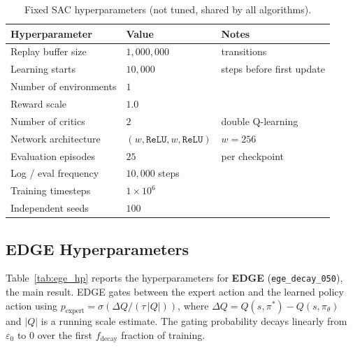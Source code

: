 \begin{table}[h]
\centering
\caption{Fixed SAC hyperparameters (not tuned, shared by all algorithms).}
\label{tab:sac_fixed}
\begin{tabular}{lll}
\toprule
\textbf{Hyperparameter} & \textbf{Value} & \textbf{Notes} \\
\midrule
Replay buffer size        & $1{,}000{,}000$        & transitions \\
Learning starts           & $10{,}000$             & steps before first update \\
Number of environments    & $1$                    & \\
Reward scale              & $1.0$                  & \\
Number of critics         & $2$                    & double Q-learning \\
Network architecture      & $(w, \texttt{ReLU}, w, \texttt{ReLU})$ & $w=256$ \\
Evaluation episodes       & $25$                   & per checkpoint \\
Log / eval frequency      & $10{,}000$ steps       & \\
Training timesteps        & $1 \times 10^{6}$      & \\
Independent seeds         & $100$                  & \\
\bottomrule
\end{tabular}
\end{table}

\subsection*{EDGE Hyperparameters}

Table~\ref{tab:ege_hp} reports the hyperparameters for \textbf{EDGE}
(\texttt{ege\_decay\_050}), the main result.
EDGE gates between the expert action and the learned policy action using
$p_{\text{expert}} = \sigma\!\left(\Delta Q / (\tau\,|Q|)\right)$, where
$\Delta Q = Q(s, \pi^*) - Q(s, \pi_\theta)$ and $|Q|$ is a running scale
estimate.
The gating probability decays linearly from $\varepsilon_0$ to $0$ over the
first $f_{\mathrm{decay}}$ fraction of training.

